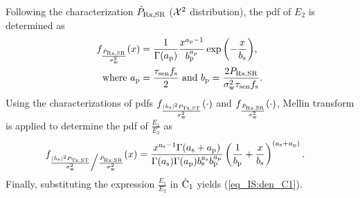 {\begin{IEEEproof}[Solution]
Following the characterization $\eprcvdsr$ ($\cchi2$ distribution), the pdf of $E_2$ is determined as 
\begin{align}
\dsnrp(x) &= \frac{1}{\Gamma(\ap)} \frac{x^{\ap-1}}{\bp^{\ap}} \exp{\left(- \frac{x}{\bs}\right)} \label{eq_IS:dsnrp}, \\   
\text{ where } \ap &= \frac{\tsen \fsam}{2} \text{ and } \bp = \frac{2 \prcvdsr}{\npo \tsen\fsam}. \label{eq_IS:dsnrp_para}
\end{align}
Using the characterizations of pdfs $\dsnrs(\cdot)$ and $\dsnrp(\cdot)$, Mellin transform \cite{NIST} is applied to determine the pdf of $\frac{E_1}{E_2}$ as
\begin{align}
\dsnrsp(x) &= \frac{x^{\as - 1} \Gamma(\as + \ap)}{\Gamma(\as) \Gamma(\ap) \bs^{\as} \bp^{\ap}} \left(\frac{1}{\bp} + \frac{x}{\bs}\right)^{(\as + \ap)}. \label{eq_IS:dsnrsp} 
\end{align} 
Finally, substituting the expression $\frac{E_1}{E_2}$ in $\eco$ yields (\ref{eq_IS:den_C1}).
\end{IEEEproof}



}
